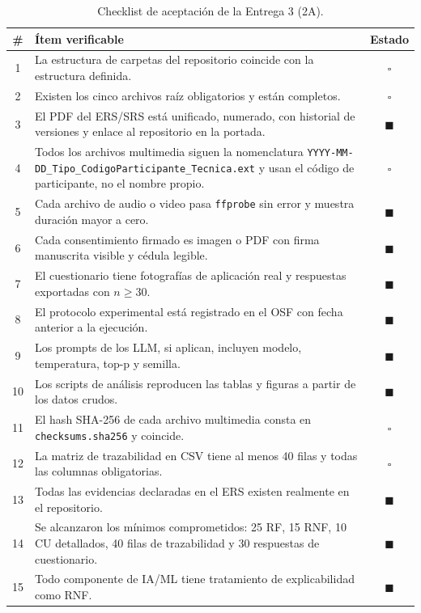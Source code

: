 \documentclass[journal,onecolumn]{IEEEtran}
\begin{document}
	\begin{table}[H]
		\centering
		\caption{Checklist de aceptación de la Entrega 3 (2A).}
		\label{tab:checklist}
		\small
		\begin{tabularx}{\textwidth}{@{}c X c@{}}
			\toprule
			\textbf{\#} & \textbf{Ítem verificable} & \textbf{Estado} \\
			\midrule
			1 & La estructura de carpetas del repositorio coincide con la estructura definida. & $\square$ \\
			2 & Existen los cinco archivos raíz obligatorios y están completos. & $\square$ \\
			3 & El PDF del ERS/SRS está unificado, numerado, con historial de versiones y enlace al repositorio en la portada. & $\blacksquare$ \\
			4 & Todos los archivos multimedia siguen la nomenclatura \texttt{YYYY-MM-DD\_Tipo\_CodigoParticipante\_Tecnica.ext} y usan el código de participante, no el nombre propio. & $\square$ \\
			5 & Cada archivo de audio o video pasa \texttt{ffprobe} sin error y muestra duración mayor a cero. & $\blacksquare$ \\
			6 & Cada consentimiento firmado es imagen o PDF con firma manuscrita visible y cédula legible. & $\blacksquare$ \\
			7 & El cuestionario tiene fotografías de aplicación real y respuestas exportadas con $n \geq 30$. & $\blacksquare$ \\
			8 & El protocolo experimental está registrado en el OSF con fecha anterior a la ejecución. & $\blacksquare$ \\
			9 & Los prompts de los LLM, si aplican, incluyen modelo, temperatura, top-p y semilla. & $\blacksquare$ \\
			10 & Los scripts de análisis reproducen las tablas y figuras a partir de los datos crudos. & $\blacksquare$ \\
			11 & El hash SHA-256 de cada archivo multimedia consta en \texttt{checksums.sha256} y coincide. & $\square$ \\
			12 & La matriz de trazabilidad en CSV tiene al menos 40 filas y todas las columnas obligatorias. & $\square$ \\
			13 & Todas las evidencias declaradas en el ERS existen realmente en el repositorio. & $\blacksquare$ \\
			14 & Se alcanzaron los mínimos comprometidos: 25 RF, 15 RNF, 10 CU detallados, 40 filas de trazabilidad y 30 respuestas de cuestionario. & $\blacksquare$ \\
			15 & Todo componente de IA/ML tiene tratamiento de explicabilidad como RNF. & $\blacksquare$ \\
			\bottomrule
		\end{tabularx}
	\end{table}
	
\end{document}
